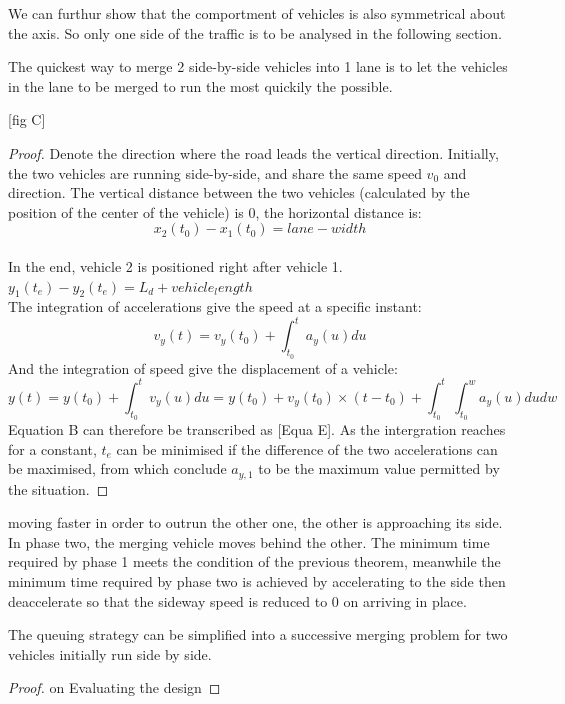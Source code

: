 \documentclass{mcmthesis}
\begin{document}
We can furthur show that the comportment of vehicles is also symmetrical about the axis. So only one side of the traffic is to be analysed in the following section.

\begin{Theorem} \label{thm:yingsongsheng2}
The quickest way to merge 2 side-by-side vehicles into 1 lane is to let the vehicles in the lane to be merged to run the most quickily the possible.
\end{Theorem}

[fig C]

\begin{proof}
Denote the direction where the road leads the vertical direction.
Initially, the two vehicles are running side-by-side, and share the same speed $v_0$ and direction.
The vertical distance between the two vehicles (calculated by the position of the center of the vehicle) is 0, the horizontal distance is: $$x_2(t_0)-x_1(t_0)=lane-width$$\\
In the end, vehicle 2 is positioned right after vehicle 1.
$y_1(t_e)-y_2(t_e)=L_d+vehicle_length$\\
The integration of accelerations give the speed at a specific instant:
 $$v_y(t)=v_y(t_0)+ \int_{t_0}^{t}a_y(u)du$$
And the integration of speed give the displacement of a vehicle:
$$y(t)=y(t_0)+ \int_{t_0}^{t}v_y(u)du=y(t_0)+v_y(t_0) \times (t-t_0)+ \int_{t_0}^{t}\int_{t_0}^{w}a_y(u)dudw$$
Equation B can therefore be transcribed as 
[Equa E].
As the intergration reaches for a constant, $t_e$ can be minimised if the difference of the two accelerations can be maximised, from which conclude $a_{y,1}$ to be the maximum value permitted by the situation.
\end{proof}

moving faster in order to outrun the other one, the other is approaching its side. In phase two, the merging vehicle moves behind the other. The minimum time required by phase 1 meets the condition of the previous theorem, meanwhile the minimum time required by phase two is achieved by accelerating to the side then deaccelerate so that the sideway speed is reduced to 0 on arriving in place.

\begin{Theorem} \label{thm:yingsongsheng3}
The queuing strategy can be simplified into a successive merging problem for two vehicles initially run side by side. 
\end{Theorem}

\begin{proof}

on Evaluating the design
\end{proof}
\end{document}
